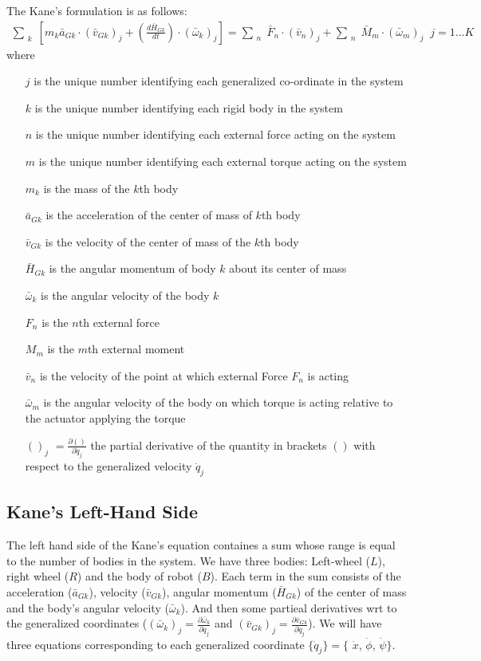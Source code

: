 \documentclass[a4paper,10pt]{article}
\begin{document}
The Kane's formulation is as follows:
\begin{align}
 \sum_{\substack{k}} \left[ m_k \bar{a}_{Gk} \cdot \left(\bar{v}_{Gk}\right)_j + \left( \frac{d\bar{H}_{Gk}}{dt} 
 \right) \cdot \left( \bar\omega_k \right)_j \right] = \sum_{\substack{n}}  \bar{F}_n \cdot \left( \bar{v}_n \right)_j 
 + \sum_{\substack{n}}  \bar{M}_m \cdot \left( \bar{\omega}_m \right)_j \;\; j=1 ... K \label{kanes}
\end{align}
where 
\begin{itemize}[label={}]
\item[$j$] is the unique number identifying each generalized co-ordinate in the system
\item[$k$] is the unique number identifying each rigid body in the system
\item[$n$] is the unique number identifying each external force acting on the system
\item[$m$] is the unique number identifying each external torque acting on the system
\item[$m_k$] is the mass of the $k$th body
\item[$\bar{a}_{Gk}$] is the acceleration of the center of mass of $k$th body
\item[$\bar{v}_{Gk}$] is the velocity of the center of mass of the $k$th body
\item[$\bar{H}_{Gk}$] is the angular momentum of body $k$ about its center of mass
\item[$\bar{\omega}_{k}$] is the angular velocity of the body $k$
\item[$F_n$] is the $n$th external force
\item[$M_m$] is the $m$th external moment
\item[$\bar{v}_{n}$] is the velocity of the point at which external Force $F_n$ is acting
\item[$\bar{\omega}_{m}$] is the angular velocity of the body on which torque is acting relative to the actuator applying the torque
\item[$()_j$] $=\frac{\partial ()}{\partial \dot{q}_j}$ the partial derivative of the quantity in brackets $()$ with respect to the generalized
velocity $\dot{q}_j$
\end{itemize}

\subsection{Kane's Left-Hand Side}
The left hand side of the Kane's equation containes a sum whose range is equal to the number of bodies
in the system. We have three bodies: Left-wheel ($L$), right wheel ($R$) and the body of robot ($B$). 
Each term in the sum consists of the acceleration ($\bar{a}_{Gk}$), velocity ($\bar{v}_{Gk}$), 
angular momentum ($\bar{H}_{Gk}$) of the center of mass and the body's angular velocity ($\bar{\omega}_k$). 
And then some partieal derivatives wrt to the generalized coordinates 
($(\bar{\omega}_k)_j=\frac{\partial \bar{\omega}_k}{\partial \dot{q}_j}$ and 
$(\bar{v}_{Gk})_j=\frac{\partial \bar{v}_{Gk}}{\partial \dot{q}_j}$). We will have three equations 
corresponding to each generalized coordinate $\{\dot{q}_j\} = \{$ $\dot{x}$, $\dot{\phi}$, $\dot{\psi} \}$.
\end{document}
